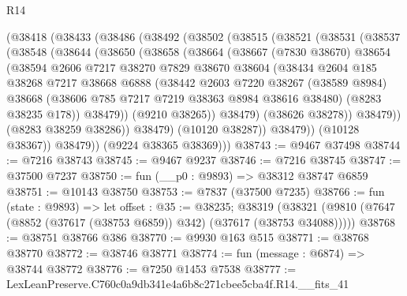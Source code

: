 \begin{lexlean}{R14}
\begin{coremodule}
    (@38418
      (@38433
        (@38486
          (@38492
            (@38502
              (@38515
                (@38521
                  (@38531
                    (@38537
                      (@38548
                        (@38644
                          (@38650
                            (@38658
                              (@38664
                                (@38667
                                  (@7830 @38670)
                                  @38654
                                  (@38594
                                    @2606
                                    @7217
                                    @38270
                                    @7829
                                    @38670
                                    @38604
                                    (@38434
                                      @2604
                                      @185
                                      @38268
                                      @7217
                                      @38668
                                      @6888
                                      (@38442
                                        @2603
                                        @7220
                                        @38267
                                        (@38589 @8984)
                                        @38668
                                        (@38606 @785 @7217 @7219 @38363 @8984 @38616 @38480)
                                        (@8283 @38235 @178))
                                      @38479))
                                  (@9210 @38265))
                                @38479)
                              (@38626 @38278))
                            @38479))
                        (@8283 @38259 @38286))
                      @38479)
                    (@10120 @38287))
                  @38479))
              (@10128 @38367))
            @38479))
        (@9224 @38365 @38369)))
@38743 := @9467 @37498
@38744 := @7216 @38743
@38745 := @9467 @9237
@38746 := @7216 @38745
@38747 := @37500 @7237
@38750 := fun (__p0 : @9893) => @38312 @38747 @6859
@38751 := @10143 @38750
@38753 := @7837 (@37500 @7235)
@38766 := fun (state : @9893) =>
  let offset : @35 := @38235;
  @38319 (@38321 (@9810 (@7647 (@8852 (@37617 (@38753 @6859)) @342) (@37617 (@38753 @34088)))))
@38768 := @38751 @38766 @386
@38770 := @9930 @163 @515
@38771 := @38768 @38770
@38772 := @38746 @38771
@38774 := fun (message : @6874) => @38744 @38772
@38776 := @7250 @1453 @7538
@38777 := LexLeanPreserve.C760c0a9db341e4a6b8c271cbee5cba4f.R14.__fits_41

\end{coremodule}
\end{lexlean}
